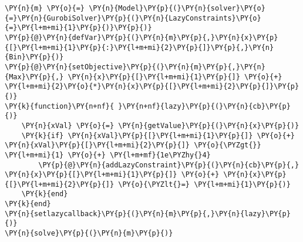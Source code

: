 \begin{Verbatim}[commandchars=\\\{\}]
\PY{n}{m} \PY{o}{=} \PY{n}{Model}\PY{p}{(}\PY{n}{solver}\PY{o}{=}\PY{n}{GurobiSolver}\PY{p}{(}\PY{n}{LazyConstraints}\PY{o}{=}\PY{l+m+mi}{1}\PY{p}{)}\PY{p}{)}
\PY{p}{@}\PY{n}{defVar}\PY{p}{(}\PY{n}{m}\PY{p}{,}\PY{n}{x}\PY{p}{[}\PY{l+m+mi}{1}\PY{p}{:}\PY{l+m+mi}{2}\PY{p}{]}\PY{p}{,}\PY{n}{Bin}\PY{p}{)}
\PY{p}{@}\PY{n}{setObjective}\PY{p}{(}\PY{n}{m}\PY{p}{,}\PY{n}{Max}\PY{p}{,} \PY{n}{x}\PY{p}{[}\PY{l+m+mi}{1}\PY{p}{]} \PY{o}{+} \PY{l+m+mi}{2}\PY{o}{*}\PY{n}{x}\PY{p}{[}\PY{l+m+mi}{2}\PY{p}{]}\PY{p}{)}
\PY{k}{function}\PY{n+nf}{ }\PY{n+nf}{lazy}\PY{p}{(}\PY{n}{cb}\PY{p}{)}
    \PY{n}{xVal} \PY{o}{=} \PY{n}{getValue}\PY{p}{(}\PY{n}{x}\PY{p}{)}
    \PY{k}{if} \PY{n}{xVal}\PY{p}{[}\PY{l+m+mi}{1}\PY{p}{]} \PY{o}{+} \PY{n}{xVal}\PY{p}{[}\PY{l+m+mi}{2}\PY{p}{]} \PY{o}{\PYZgt{}} \PY{l+m+mi}{1} \PY{o}{+} \PY{l+m+mf}{1e\PYZhy{}4}
        \PY{p}{@}\PY{n}{addLazyConstraint}\PY{p}{(}\PY{n}{cb}\PY{p}{,} \PY{n}{x}\PY{p}{[}\PY{l+m+mi}{1}\PY{p}{]} \PY{o}{+} \PY{n}{x}\PY{p}{[}\PY{l+m+mi}{2}\PY{p}{]} \PY{o}{\PYZlt{}=} \PY{l+m+mi}{1}\PY{p}{)}
    \PY{k}{end}
\PY{k}{end}
\PY{n}{setlazycallback}\PY{p}{(}\PY{n}{m}\PY{p}{,}\PY{n}{lazy}\PY{p}{)}
\PY{n}{solve}\PY{p}{(}\PY{n}{m}\PY{p}{)}
\end{Verbatim}
